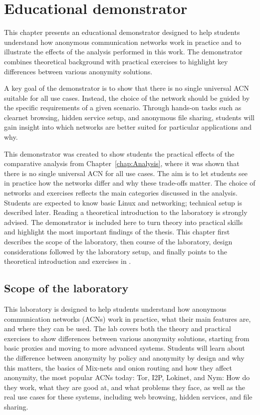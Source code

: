 \chapter{Educational demonstrator}
\label{chap:EducationalDemonstrator}
This chapter presents an educational demonstrator designed to help students understand how anonymous communication networks work in practice and to illustrate the effects of the analysis performed in this work. The demonstrator combines theoretical background with practical exercises to highlight key differences between various anonymity solutions.

A key goal of the demonstrator is to show that there is no single universal ACN suitable for all use cases. Instead, the choice of the network should be guided by the specific requirements of a given scenario. Through hands-on tasks such as clearnet browsing, hidden service setup, and anonymous file sharing, students will gain insight into which networks are better suited for particular applications and why.

This demonstrator was created to show students the practical effects of the comparative analysis from Chapter~\ref{chap:Analysis}, where it was shown that there is no single universal ACN for all use cases. The aim is to let students see in practice how the networks differ and why these trade-offs matter. The choice of networks and exercises reflects the main categories discussed in the analysis. Students are expected to know basic Linux and networking; technical setup is described later. Reading a theoretical introduction to the laboratory is strongly advised. The demonstrator is included here to turn theory into practical skills and highlight the most important findings of the thesis. This chapter first describes the scope of the laboratory, then course of the laboratory, design considerations followed by the laboratory setup, and finally points to the theoretical introduction and exercises in .

\section{Scope of the laboratory}
This laboratory is designed to help students understand how anonymous communication networks (ACNs) work in practice, what their main features are, and where they can be used. The lab covers both the theory and practical exercises to show differences between various anonymity solutions, starting from basic proxies and moving to more advanced systems. Students will learn about the difference between anonymity by policy and anonymity by design and why this matters, the basics of Mix-nets and onion routing and how they affect anonymity, the most popular ACNs today: Tor, I2P, Lokinet, and Nym: How do they work, what they are good at, and what problems they face, as well as the real use cases for these systems, including web browsing, hidden services, and file sharing.


